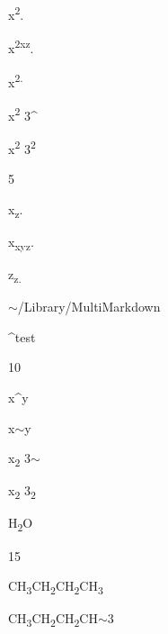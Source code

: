 
\def\mytitle{Superscript}


x\textsuperscript{2}.

x\textsuperscript{2xz}.

x\textsuperscript{2.}

x\textsuperscript{2} 3\^{}

x\textsuperscript{2} 3\textsuperscript{2}

5

x\textsubscript{z}.

x\textsubscript{xyz}.

z\textsubscript{z.}

\ensuremath{\sim}\slash Library\slash MultiMarkdown

\^{}test

10

x\^{}y

x\ensuremath{\sim}y

x\textsubscript{2} 3\ensuremath{\sim}

x\textsubscript{2} 3\textsubscript{2}

H\textsubscript{2}O

15

CH\textsubscript{3}CH\textsubscript{2}CH\textsubscript{2}CH\textsubscript{3}

CH\textsubscript{3}CH\textsubscript{2}CH\textsubscript{2}CH\ensuremath{\sim}3




